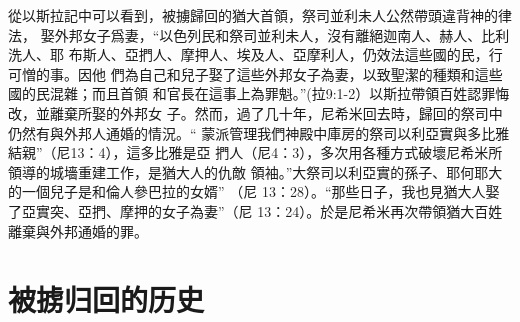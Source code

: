 從以斯拉記中可以看到，被擄歸回的猶大首領，祭司並利未人公然帶頭違背神的律法，
娶外邦女子爲妻，“以色列民和祭司並利未人，沒有離絕迦南人、赫人、比利洗人、耶
布斯人、亞捫人、摩押人、埃及人、亞摩利人，仍效法這些國的民，行可憎的事。因他
們為自己和兒子娶了這些外邦女子為妻，以致聖潔的種類和這些國的民混雜；而且首領
和官長在這事上為罪魁。”(拉9:1-2）以斯拉帶領百姓認罪悔改，並離棄所娶的外邦女
子。然而，過了几十年，尼希米回去時，歸回的祭司中仍然有與外邦人通婚的情況。“
蒙派管理我們神殿中庫房的祭司以利亞實與多比雅結親”（尼13：4），這多比雅是亞
捫人（尼4：3），多次用各種方式破壞尼希米所領導的城墻重建工作，是猶大人的仇敵
領袖。”大祭司以利亞實的孫子、耶何耶大的一個兒子是和倫人參巴拉的女婿” （尼
13：28）。“那些日子，我也見猶大人娶了亞實突、亞捫、摩押的女子為妻”（尼
13：24）。於是尼希米再次帶領猶大百姓離棄與外邦通婚的罪。


\section{被掳归回的历史}


